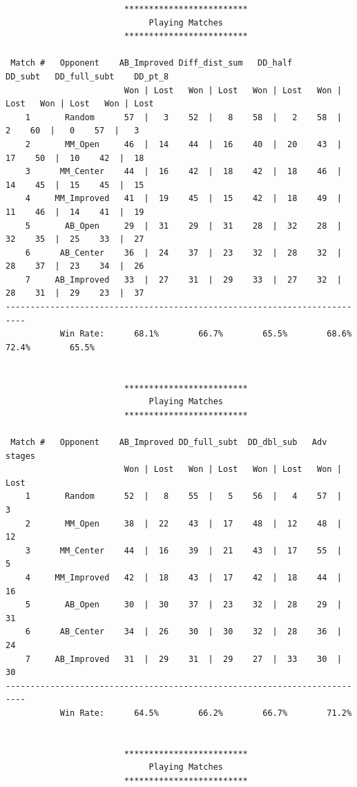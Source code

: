 \documentclass[a4paper,12pt]{article}
\begin{document}
\begin{verbatim}
                        *************************                         
                             Playing Matches                              
                        *************************                         

 Match #   Opponent    AB_Improved Diff_dist_sum   DD_half      DD_subt   DD_full_subt    DD_pt_8   
                        Won | Lost   Won | Lost   Won | Lost   Won | Lost   Won | Lost   Won | Lost 
    1       Random      57  |   3    52  |   8    58  |   2    58  |   2    60  |   0    57  |   3  
    2       MM_Open     46  |  14    44  |  16    40  |  20    43  |  17    50  |  10    42  |  18  
    3      MM_Center    44  |  16    42  |  18    42  |  18    46  |  14    45  |  15    45  |  15  
    4     MM_Improved   41  |  19    45  |  15    42  |  18    49  |  11    46  |  14    41  |  19  
    5       AB_Open     29  |  31    29  |  31    28  |  32    28  |  32    35  |  25    33  |  27  
    6      AB_Center    36  |  24    37  |  23    32  |  28    32  |  28    37  |  23    34  |  26  
    7     AB_Improved   33  |  27    31  |  29    33  |  27    32  |  28    31  |  29    23  |  37  
--------------------------------------------------------------------------
           Win Rate:      68.1%        66.7%        65.5%        68.6%        72.4%        65.5%    
                

                        *************************                         
                             Playing Matches                              
                        *************************                         

 Match #   Opponent    AB_Improved DD_full_subt  DD_dbl_sub   Adv stages  
                        Won | Lost   Won | Lost   Won | Lost   Won | Lost 
    1       Random      52  |   8    55  |   5    56  |   4    57  |   3  
    2       MM_Open     38  |  22    43  |  17    48  |  12    48  |  12  
    3      MM_Center    44  |  16    39  |  21    43  |  17    55  |   5  
    4     MM_Improved   42  |  18    43  |  17    42  |  18    44  |  16  
    5       AB_Open     30  |  30    37  |  23    32  |  28    29  |  31  
    6      AB_Center    34  |  26    30  |  30    32  |  28    36  |  24  
    7     AB_Improved   31  |  29    31  |  29    27  |  33    30  |  30  
--------------------------------------------------------------------------
           Win Rate:      64.5%        66.2%        66.7%        71.2%    


                        *************************                         
                             Playing Matches                              
                        *************************                         


\end{verbatim}
\end{document}
